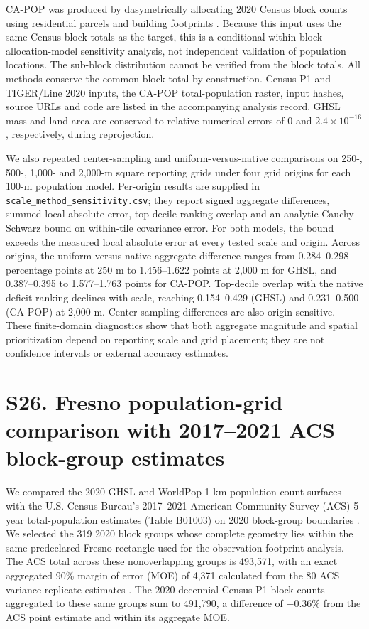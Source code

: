 \documentclass[10pt,a4paper]{article}
\begin{document}
CA-POP was produced by dasymetrically allocating 2020 Census block counts using residential parcels and building footprints \citep{depsky2022capop}. Because this input uses the same Census block totals as the target, this is a conditional within-block allocation-model sensitivity analysis, not independent validation of population locations. The sub-block distribution cannot be verified from the block totals. All methods conserve the common block total by construction. Census P1 and TIGER/Line 2020 inputs, the CA-POP total-population raster, input hashes, source URLs and code are listed in the accompanying analysis record. GHSL mass and land area are conserved to relative numerical errors of $0$ and $2.4\times10^{-16}$, respectively, during reprojection.

We also repeated center-sampling and uniform-versus-native comparisons on 250-, 500-, 1,000- and 2,000-m square reporting grids under four grid origins for each 100-m population model. Per-origin results are supplied in \texttt{scale\_method\_sensitivity.csv}; they report signed aggregate differences, summed local absolute error, top-decile ranking overlap and an analytic Cauchy--Schwarz bound on within-tile covariance error. For both models, the bound exceeds the measured local absolute error at every tested scale and origin. Across origins, the uniform-versus-native aggregate difference ranges from 0.284--0.298 percentage points at 250 m to 1.456--1.622 points at 2,000 m for GHSL, and 0.387--0.395 to 1.577--1.763 points for CA-POP. Top-decile overlap with the native deficit ranking declines with scale, reaching 0.154--0.429 (GHSL) and 0.231--0.500 (CA-POP) at 2,000 m. Center-sampling differences are also origin-sensitive. These finite-domain diagnostics show that both aggregate magnitude and spatial prioritization depend on reporting scale and grid placement; they are not confidence intervals or external accuracy estimates.





\section*{S26. Fresno population-grid comparison with 2017--2021 ACS block-group estimates}

We compared the 2020 GHSL and WorldPop 1-km population-count surfaces with the U.S. Census Bureau's 2017--2021 American Community Survey (ACS) 5-year total-population estimates (Table B01003) on 2020 block-group boundaries \citep{acs2021summary,tiger2020blockgroups}. We selected the 319 2020 block groups whose complete geometry lies within the same predeclared Fresno rectangle used for the observation-footprint analysis. The ACS total across these nonoverlapping groups is 493,571, with an exact aggregated 90\% margin of error (MOE) of 4,371 calculated from the 80 ACS variance-replicate estimates \citep{acs2021vre}. The 2020 decennial Census P1 block counts aggregated to these same groups sum to 491,790, a difference of $-0.36\%$ from the ACS point estimate and within its aggregate MOE.
\end{document}
